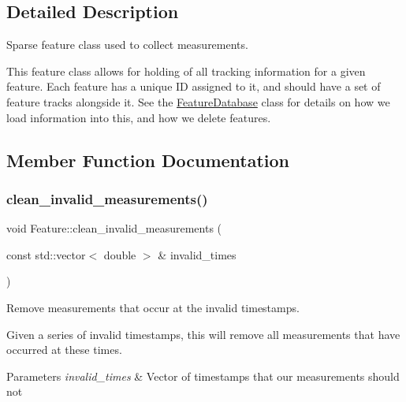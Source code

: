 \subsection{Detailed Description}
Sparse feature class used to collect measurements. 

This feature class allows for holding of all tracking information for a given feature. Each feature has a unique ID assigned to it, and should have a set of feature tracks alongside it. See the \hyperlink{classov__core_1_1FeatureDatabase}{Feature\+Database} class for details on how we load information into this, and how we delete features. 

\subsection{Member Function Documentation}
\mbox{\label{classov__core_1_1Feature_a9daa91fb3836d23563bdc9aad6686ee1}} 
\subsubsection{\texorpdfstring{clean\+\_\+invalid\+\_\+measurements()}{clean\_invalid\_measurements()}}
{\footnotesize\ttfamily void Feature\+::clean\+\_\+invalid\+\_\+measurements (\begin{DoxyParamCaption}\item[{const std\+::vector$<$ double $>$ \&}]{invalid\+\_\+times }\end{DoxyParamCaption})}



Remove measurements that occur at the invalid timestamps. 

Given a series of invalid timestamps, this will remove all measurements that have occurred at these times.


\begin{DoxyParams}{Parameters}
{\em invalid\+\_\+times} & Vector of timestamps that our measurements should not \\
\hline
\end{DoxyParams}
\mbox{\label{classov__core_1_1Feature_aee27e65f3de5581ededd30646479e315}} 

